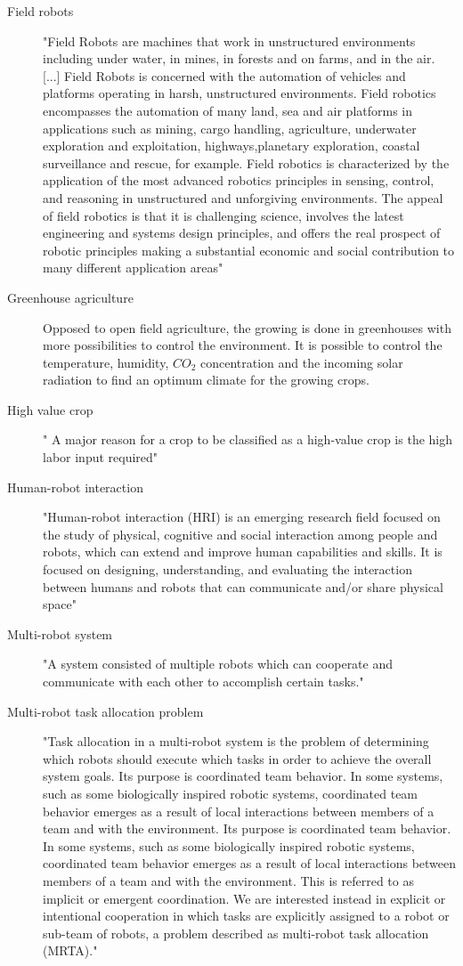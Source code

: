 \begin{description}
        \item[Field robots] "Field Robots are machines that work in unstructured environments including under water, in mines, in forests and on farms, and in the air. [...] Field Robots is concerned with the automation of vehicles and platforms operating in harsh, unstructured environments. Field robotics encompasses the automation of many land, sea and air platforms in applications such as mining, cargo handling, agriculture, underwater exploration and exploitation, highways,planetary exploration, coastal surveillance and rescue, for example. Field robotics is characterized by the application of the most advanced robotics principles in sensing, control, and reasoning in unstructured and unforgiving environments. The appeal of field robotics is that it is challenging science, involves the latest engineering and systems design principles, and offers the real prospect of robotic principles making a substantial economic and social contribution to many different application areas" \cite{Thorpe2001}
        \item[Greenhouse agriculture] Opposed to open field agriculture, the growing is done in greenhouses with more possibilities to control the environment. It is possible to control the temperature, humidity, $CO_2$ concentration and the incoming solar radiation to find an optimum climate for the growing crops.
        \item[High value crop] " A major reason for a crop to be classified as a high-value crop is the high labor input required" \cite{Bac2014}
        \item[Human-robot interaction] "Human-robot interaction (HRI) is an emerging research field focused on the study of physical, cognitive and social interaction among people and robots, which can extend and improve human capabilities and skills. It is focused on designing, understanding, and evaluating the interaction between humans and robots that can communicate and/or share physical space" \cite{Vasconez2019}
        \item[Multi-robot system] "A system consisted of multiple robots which can cooperate and communicate with each other to accomplish certain tasks." \cite{IGIGlobal2020}
        \item[Multi-robot task allocation problem] "Task allocation in a multi-robot system is the problem of determining which robots should execute which tasks in order to achieve the overall system goals. Its purpose is coordinated team behavior. In some systems, such as some biologically inspired robotic systems, coordinated team behavior emerges as a result of local interactions between members of a team and with the environment. Its purpose is coordinated team behavior. In some systems, such as some biologically inspired robotic systems, coordinated team behavior emerges as a result of local interactions between members of a team and with the environment. This is referred to as implicit or emergent coordination. We are interested instead in explicit or intentional cooperation in which tasks are explicitly assigned to a robot or sub-team of robots, a problem described as multi-robot task allocation (MRTA)." \cite{Korsah2013}

\end{description}
